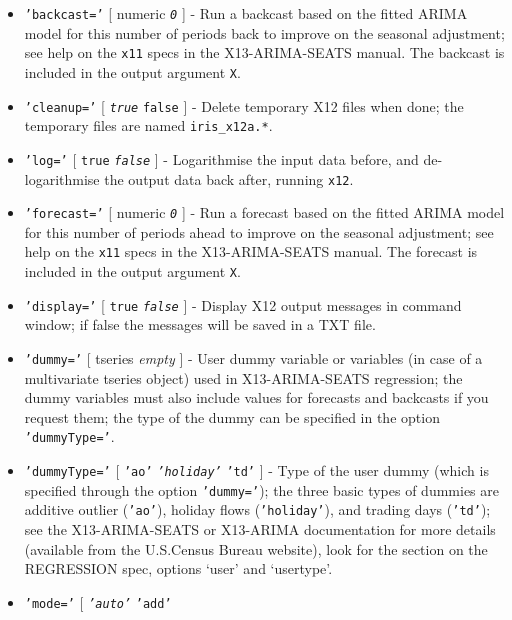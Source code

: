  \begin{itemize}
 \item
   \texttt{'backcast='} {[} numeric \textbar{} \emph{\texttt{0}} {]} -
   Run a backcast based on the fitted ARIMA model for this number of
   periods back to improve on the seasonal adjustment; see help on the
   \texttt{x11} specs in the X13-ARIMA-SEATS manual. The backcast is
   included in the output argument \texttt{X}.
 \item
   \texttt{'cleanup='} {[} \emph{\texttt{true}} \textbar{} \texttt{false}
   {]} - Delete temporary X12 files when done; the temporary files are
   named \texttt{iris\_x12a.*}.
 \item
   \texttt{'log='} {[} \texttt{true} \textbar{} \emph{\texttt{false}} {]}
   - Logarithmise the input data before, and de-logarithmise the output
   data back after, running \texttt{x12}.
 \item
   \texttt{'forecast='} {[} numeric \textbar{} \emph{\texttt{0}} {]} -
   Run a forecast based on the fitted ARIMA model for this number of
   periods ahead to improve on the seasonal adjustment; see help on the
   \texttt{x11} specs in the X13-ARIMA-SEATS manual. The forecast is
   included in the output argument \texttt{X}.
 \item
   \texttt{'display='} {[} \texttt{true} \textbar{} \emph{\texttt{false}}
   {]} - Display X12 output messages in command window; if false the
   messages will be saved in a TXT file.
 \item
   \texttt{'dummy='} {[} tseries \textbar{} \emph{empty} {]} - User dummy
   variable or variables (in case of a multivariate tseries object) used
   in X13-ARIMA-SEATS regression; the dummy variables must also include
   values for forecasts and backcasts if you request them; the type of
   the dummy can be specified in the option \texttt{'dummyType='}.
 \item
   \texttt{'dummyType='} {[} \texttt{'ao'} \textbar{}
   \emph{\texttt{'holiday'}} \textbar{} \texttt{'td'} {]} - Type of the
   user dummy (which is specified through the option \texttt{'dummy='});
   the three basic types of dummies are additive outlier (\texttt{'ao'}),
   holiday flows (\texttt{'holiday'}), and trading days (\texttt{'td'});
   see the X13-ARIMA-SEATS or X13-ARIMA documentation for more details
   (available from the U.S.Census Bureau website), look for the section
   on the REGRESSION spec, options `user' and `usertype'.
 \item
   \texttt{'mode='} {[} \emph{\texttt{'auto'}} \textbar{} \texttt{'add'}

\end{itemize}
